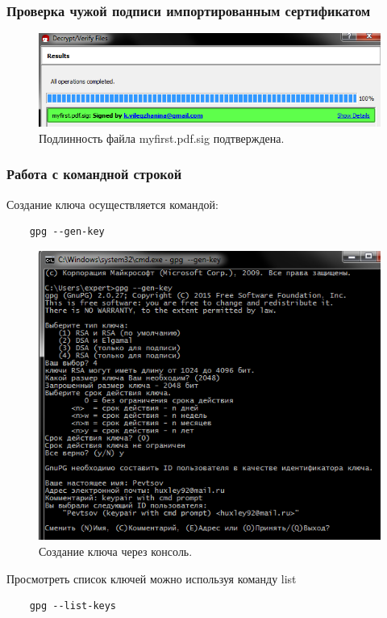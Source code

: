 \documentclass[a4paper, 14pt]{article}				%
\begin{document}
\subsubsection{Проверка чужой подписи импортированным сертификатом}
\begin{figure}[h!]
\centering
\includegraphics[width=\textwidth]{fig12}
\caption{Подлинность файла myfirst.pdf.sig подтверждена.}
\end{figure}

\subsubsection{Работа с командной строкой}
Создание ключа осуществляется командой:
\begin{verbatim}
	gpg --gen-key
\end{verbatim}

\begin{figure}[h!]
\centering
\includegraphics[width=\textwidth]{fig13}
\caption{Создание ключа через консоль.}
\end{figure}
Просмотреть список ключей можно используя команду list
\begin{verbatim}
	gpg --list-keys
\end{verbatim}
\end{document}
